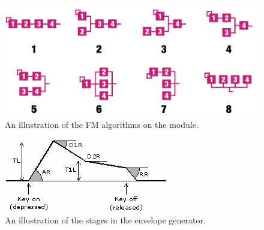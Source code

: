 \documentclass[12pt,a4paper]{article}
\begin{document}
\begin{figure}[!htp]
\centering
\includegraphics[width=\maxwidth{\textwidth}]{2612-Operators}
\caption{An illustration of the FM algorithms on the module.}
\label{fig:fm-algorithms}
\end{figure}

\begin{figure}[!htp]
\centering
\includegraphics[width=\maxwidth{\textwidth}]{envelope}
\caption{An illustration of the stages in the envelope generator.}
\label{fig:envelope-generator}
\end{figure}
\end{document}
